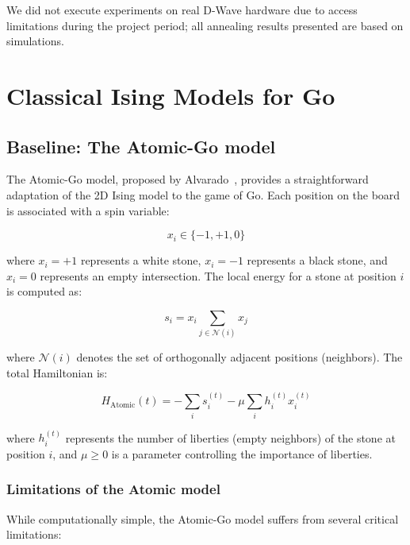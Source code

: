 \documentclass[aps,prl,reprint]{revtex4-2}
\begin{document}
We did not execute experiments on real D-Wave hardware due to access limitations during the project period; all annealing results presented are based on simulations.

\section{Classical Ising Models for Go}

\subsection{Baseline: The Atomic-Go model}

The Atomic-Go model, proposed by Alvarado~\cite{alvarado2020}, provides a straightforward adaptation of the 2D Ising model to the game of Go. Each position on the board is associated with a spin variable:

\begin{equation}
x_i \in \{-1, +1, 0\}
\end{equation}

where $x_i = +1$ represents a white stone, $x_i = -1$ represents a black stone, and $x_i = 0$ represents an empty intersection. The local energy for a stone at position $i$ is computed as:

\begin{equation}
s_i = x_i \sum_{j \in \mathcal{N}(i)} x_j
\end{equation}

where $\mathcal{N}(i)$ denotes the set of orthogonally adjacent positions (neighbors). The total Hamiltonian is:

\begin{equation}
H_{\text{Atomic}}(t) = -\sum_i s_i^{(t)} - \mu \sum_i h_i^{(t)} x_i^{(t)}
\label{eq:atomic}
\end{equation}

where $h_i^{(t)}$ represents the number of liberties (empty neighbors) of the stone at position $i$, and $\mu \geq 0$ is a parameter controlling the importance of liberties.

\subsubsection{Limitations of the Atomic model}

While computationally simple, the Atomic-Go model suffers from several critical limitations:
\end{document}
